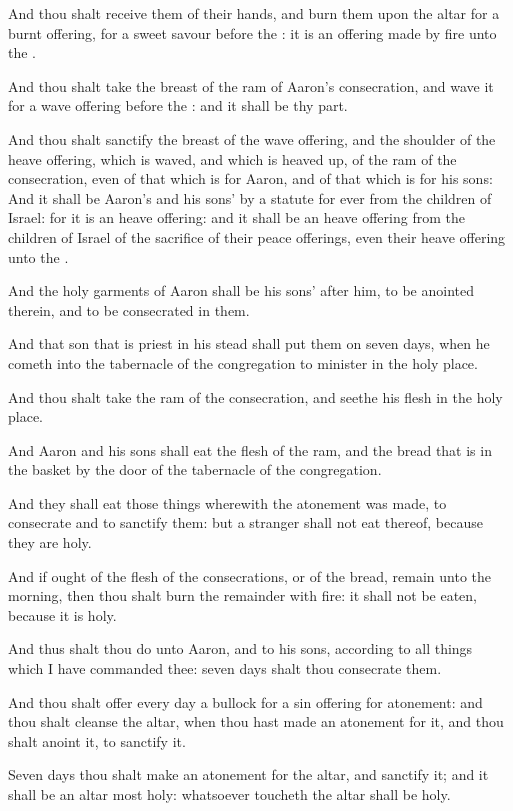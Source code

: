 \verse And thou shalt receive them of their hands, and burn them upon
the altar for a burnt offering, for a sweet savour before the \LORD: it
is an offering made by fire unto the \LORD.

\verse And thou shalt take the breast of the ram of Aaron's
consecration, and wave it for a wave offering before the \LORD: and it
shall be thy part.

\verse And thou shalt sanctify the breast of the wave offering, and the
shoulder of the heave offering, which is waved, and which is heaved
up, of the ram of the consecration, even of that which is for Aaron,
and of that which is for his sons: \verse And it shall be Aaron's and
his sons' by a statute for ever from the children of Israel: for it is
an heave offering: and it shall be an heave offering from the children
of Israel of the sacrifice of their peace offerings, even their heave
offering unto the \LORD.

\verse And the holy garments of Aaron shall be his sons' after him, to
be anointed therein, and to be consecrated in them.

\verse And that son that is priest in his stead shall put them on seven
days, when he cometh into the tabernacle of the congregation to
minister in the holy place.

\verse And thou shalt take the ram of the consecration, and seethe his
flesh in the holy place.

\verse And Aaron and his sons shall eat the flesh of the ram, and the
bread that is in the basket by the door of the tabernacle of the
congregation.

\verse And they shall eat those things wherewith the atonement was
made, to consecrate and to sanctify them: but a stranger shall not eat
thereof, because they are holy.

\verse And if ought of the flesh of the consecrations, or of the bread,
remain unto the morning, then thou shalt burn the remainder with fire:
it shall not be eaten, because it is holy.

\verse And thus shalt thou do unto Aaron, and to his sons, according to
all things which I have commanded thee: seven days shalt thou
consecrate them.

\verse And thou shalt offer every day a bullock for a sin offering for
atonement: and thou shalt cleanse the altar, when thou hast made an
atonement for it, and thou shalt anoint it, to sanctify it.

\verse Seven days thou shalt make an atonement for the altar, and
sanctify it; and it shall be an altar most holy: whatsoever toucheth
the altar shall be holy.

